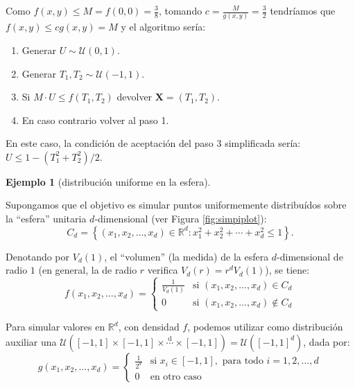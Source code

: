 \documentclass[
]{book}
\theoremstyle{break}
\theoremstyle{definition}
\theoremstyle{definition}
\newtheorem{example}{Ejemplo}[chapter]
\theoremstyle{definition}
\theoremstyle{definition}
\theoremstyle{remark}
\begin{document}
Como \(f(x, y) \leq M = f(0,0) = \frac38\), tomando \(c=\frac{M}{g(x,y)} = \frac32\)
tendríamos que \(f(x,y) \leq cg(x,y) = M\) y el algoritmo sería:

\begin{enumerate}
\def\labelenumi{\arabic{enumi}.}
\item
  Generar \(U \sim \mathcal{U}\left( 0, 1\right)\).
\item
  Generar \(T_1, T_2 \sim \mathcal{U}\left( -1, 1 \right)\).
\item
  Si \(M \cdot U\leq f\left( T_1, T_2 \right)\)
  devolver \(\mathbf{X} = \left( T_1, T_2 \right)\).
\item
  En caso contrario volver al paso 1.
\end{enumerate}

En este caso, la condición de aceptación del paso 3 simplificada sería:
\(U \leq 1 - \left( T_1^2 + T_2^2 \right) / 2\).

\begin{example}[distribución uniforme en la esfera]
\protect\hypertarget{exm:ar-esfera}{}{\label{exm:ar-esfera} {} }
\end{example}

Supongamos que el objetivo es simular puntos uniformemente distribuídos sobre la ``esfera'' unitaria \(d\)-dimensional (ver Figura \ref{fig:simpiplot}):
\[C_d=\left\{  \left( x_1, x_2, \ldots, x_d \right) \in \mathbb{R}^d
: x_1^2 + x_2^2 + \cdots + x_d^2 \leq1 \right\}.\]

Denotando por \(V_d\left( 1\right)\), el ``volumen'' (la medida) de la
esfera \(d\)-dimensional de radio \(1\) (en general, la de radio \(r\)
verifica \(V_d\left( r\right) =r^{d}V_d\left( 1\right)\)), se tiene:
\[f\left( x_1,x_2,\ldots,x_d\right)  =\left\{
\begin{array}{ll}
\frac{1}{V_d\left( 1\right)  } & \text{si } \left( x_1, x_2, \ldots
,x_d\right)  \in C_d\\
0 & \text{si } \left( x_1,x_2,\ldots,x_d\right)  \notin C_d
\end{array} \right.\]

Para simular valores en \(\mathbb{R}^{d}\), con densidad \(f\),
podemos utilizar como distribución auxiliar una
\(\mathcal{U}\left( \left[ -1,1\right] \times\left[ -1,1\right] \times\overset{\text{d}}{\cdots}\times\left[ -1,1\right] \right) = \mathcal{U}\left( \left[ -1,1\right]^{d}\right)\), dada por:
\[g\left( x_1,x_2,\ldots,x_d\right)  =\left\{
\begin{array}{ll}
\frac{1}{2^{d}} & \text{si } x_i\in\left[  -1,1\right], \text{ para todo }
i=1,2,\ldots,d\\
0 &  \text{en otro caso}
\end{array}\right.\]
\end{document}
